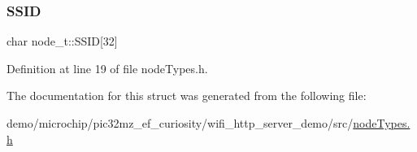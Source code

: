 \subsubsection{\texorpdfstring{S\+S\+ID}{SSID}}
{\footnotesize\ttfamily char node\+\_\+t\+::\+S\+S\+ID\mbox{[}32\mbox{]}}



Definition at line 19 of file node\+Types.\+h.



The documentation for this struct was generated from the following file\+:\begin{DoxyCompactItemize}
\item 
demo/microchip/pic32mz\+\_\+ef\+\_\+curiosity/wifi\+\_\+http\+\_\+server\+\_\+demo/src/\hyperlink{nodeTypes_8h}{node\+Types.\+h}\end{DoxyCompactItemize}
